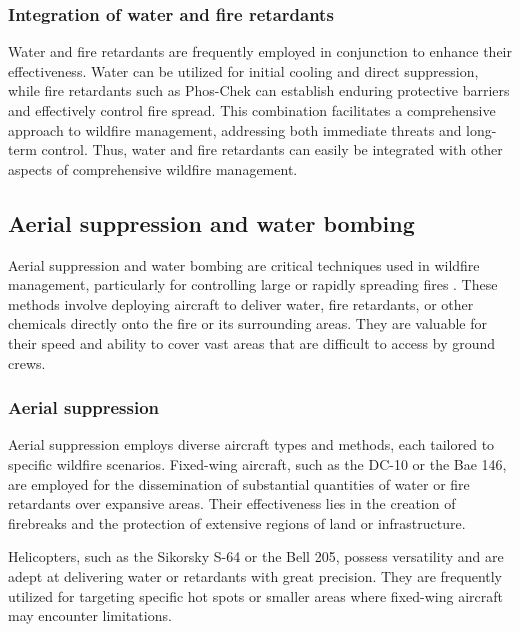 \documentclass[
  12 pt,
]{Nemilov}
\begin{document}
\subsubsection{Integration of water and fire retardants}\label{integration-of-water-and-fire-retardants}

Water and fire retardants are frequently employed in conjunction to enhance their effectiveness. Water can be utilized for initial cooling and direct suppression, while fire retardants such as Phos-Chek can establish enduring protective barriers and effectively control fire spread. This combination facilitates a comprehensive approach to wildfire management, addressing both immediate threats and long-term control. Thus, water and fire retardants can easily be integrated with other aspects of
comprehensive wildfire management.

\subsection{Aerial suppression and water bombing}\label{aerial-suppression-and-water-bombing}

Aerial suppression and water bombing are critical techniques used in wildfire management, particularly for controlling large or rapidly spreading fires \citep{graham2020extinguishing, kennedy2019values, plucinski2013criteria, underwood2012wildfire}. These methods involve deploying aircraft to deliver water, fire retardants, or other chemicals directly onto the fire or its surrounding areas. They are valuable for their speed and ability to cover vast areas that are difficult to access by ground crews.

\subsubsection{Aerial suppression}\label{aerial-suppression}

Aerial suppression employs diverse aircraft types and methods, each tailored to specific wildfire scenarios. Fixed-wing aircraft, such as the DC-10 or the Bae 146, are employed for the dissemination of substantial quantities of water or fire retardants over expansive areas. Their effectiveness lies in the creation of firebreaks and the protection of extensive regions of land or infrastructure.

Helicopters, such as the Sikorsky S-64 or the Bell 205, possess versatility and are adept at delivering water or retardants with great precision. They are frequently utilized for targeting specific hot spots or smaller areas where fixed-wing aircraft may encounter limitations.
\end{document}
